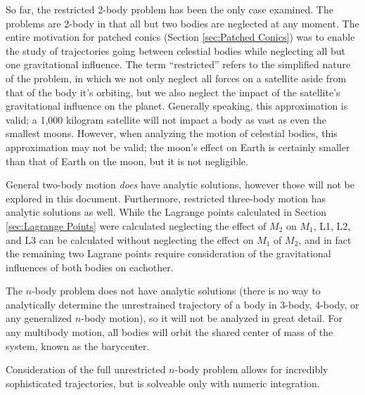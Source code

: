 \documentclass[../basicOrbitalDynamics.tex]{subfiles}
\begin{document}
So far, the restricted 2-body problem has been the only case examined. The problems are 2-body in that all but two bodies are neglected at any moment. The entire motivation for patched conics (Section  \ref{sec:Patched Conics}) was to enable the study of trajectories going between celestial bodies while neglecting all but one gravitational influence. The term ``restricted'' refers to the simplified nature of the problem, in which we not only neglect all forces on a satellite aside from that of the body it's orbiting, but we also neglect the impact of the satellite's gravitational influence on the planet. Generally speaking, this approximation is valid; a 1,000 kilogram satellite will not impact a body as vast as even the smallest moons. However, when analyzing the motion of celestial bodies, this approximation may not be valid; the moon's effect on Earth is certainly smaller than that of Earth on the moon, but it is not negligible. 

General two-body motion \textit{does} have analytic solutions, however those will not be explored in this document. Furthermore, restricted three-body motion has analytic solutions as well. While the Lagrange points calculated in Section  \ref{sec:Lagrange Points} were calculated neglecting the effect of $M_2$ on $M_1$, L1, L2, and L3 can be calculated without neglecting the effect on $M_1$ of $M_2$, and in fact the remaining two Lagrane points require consideration of the gravitational influences of both bodies on eachother.

The $n$-body problem does not have analytic solutions (there is no way to analytically determine the unrestrained trajectory of a body in 3-body, 4-body, or any generalized $n$-body motion), so it will not be analyzed in great detail. For any multibody motion, all bodies will orbit the shared center of mass of the system, known as the barycenter.

Consideration of the full unrestricted $n$-body problem allows for incredibly sophisticated trajectories, but is solveable only with numeric integration.
\end{document}
